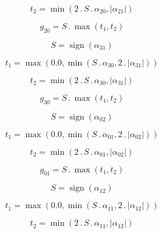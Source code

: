 \documentclass{article}
\begin{document}
\begin{dmath}t_{2} = \min\left(2 \,.\, S \,.\, \alpha_{20}, \left|{\alpha_{21}}\right|\right)\end{dmath}

\begin{dmath}g_{20} = S \,.\, \max\left(t_{1}, t_{2}\right)\end{dmath}

\begin{dmath}S = \operatorname{sign}{\left (\alpha_{31} \right )}\end{dmath}

\begin{dmath}t_{1} = \max\left(0.0, \min\left(S \,.\, \alpha_{30}, 2 \,.\, \left|{\alpha_{31}}\right|\right)\right)\end{dmath}

\begin{dmath}t_{2} = \min\left(2 \,.\, S \,.\, \alpha_{30}, \left|{\alpha_{31}}\right|\right)\end{dmath}

\begin{dmath}g_{30} = S \,.\, \max\left(t_{1}, t_{2}\right)\end{dmath}

\begin{dmath}S = \operatorname{sign}{\left (\alpha_{02} \right )}\end{dmath}

\begin{dmath}t_{1} = \max\left(0.0, \min\left(S \,.\, \alpha_{01}, 2 \,.\, \left|{\alpha_{02}}\right|\right)\right)\end{dmath}

\begin{dmath}t_{2} = \min\left(2 \,.\, S \,.\, \alpha_{01}, \left|{\alpha_{02}}\right|\right)\end{dmath}

\begin{dmath}g_{01} = S \,.\, \max\left(t_{1}, t_{2}\right)\end{dmath}

\begin{dmath}S = \operatorname{sign}{\left (\alpha_{12} \right )}\end{dmath}

\begin{dmath}t_{1} = \max\left(0.0, \min\left(S \,.\, \alpha_{11}, 2 \,.\, \left|{\alpha_{12}}\right|\right)\right)\end{dmath}

\begin{dmath}t_{2} = \min\left(2 \,.\, S \,.\, \alpha_{11}, \left|{\alpha_{12}}\right|\right)\end{dmath}
\end{document}
